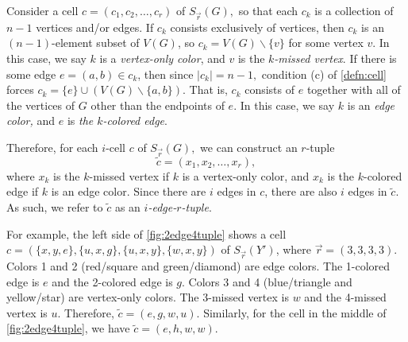 \documentclass{amsart}
\newcommand{\Sr}{S_{\vec{r}}}
\theoremstyle{definition}
\theoremstyle{remark}
\begin{document}
Consider a cell $c=(c_1,c_2,\dots,c_r)$ of $\Sr(G),$ so that each $c_k$ is a collection of $n-1$ vertices and/or edges. If $c_k$ consists exclusively of vertices, then $c_k$ is an $(n-1)$-element subset of $V(G)$, so $c_k=V(G)\backslash\{v\}$ for some vertex $v.$ In this case, we say $k$ is a \textit{vertex-only color}, and $v$ is the \textit{$k$-missed vertex}. If there is some edge $e=(a,b)\in c_k$,  then since $|c_k|=n-1,$ condition (c) of \cref{defn:cell} forces $c_k=\{e\}\cup(V(G)\backslash\{a,b\})$. That is, $c_k$ consists of $e$ together with all of the vertices of $G$ other than the endpoints of $e.$ In this case, we say $k$ is an \textit{edge color,} and $e$ is \textit{the $k$-colored edge}.

Therefore, for each $i$-cell $c$ of $\Sr(G),$ we can construct an $r$-tuple 
\[
\tilde c=(x_1,x_2,\dots,x_r),
\]
where $x_k$ is the $k$-missed vertex if $k$ is a vertex-only color, and $x_k$ is the $k$-colored edge if $k$ is an edge color. Since there are $i$ edges in $c$, there are also $i$ edges in $\tilde c.$ As such, we refer to $\tilde c$ as an \textit{$i$-edge-$r$-tuple}.

For example, the left side of \cref{fig:2edge4tuple} shows a cell $c=(\{x,y,e\},\{u,x,g\},\{u,x,y\},\{w,x,y\})$ of $\Sr(Y')$, where $\vec r = (3,3,3,3).$ Colors 1 and 2 (red/square and green/diamond) are edge colors. The 1-colored edge is $e$ and the 2-colored edge is $g.$ Colors 3 and 4 (blue/triangle and yellow/star) are vertex-only colors. The 3-missed vertex is $w$ and the 4-missed vertex is $u.$ Therefore, $\tilde c=(e,g,w,u)$. Similarly, for the cell in the middle of \cref{fig:2edge4tuple}, we have $\tilde c = (e, h, w, w).$
\end{document}
